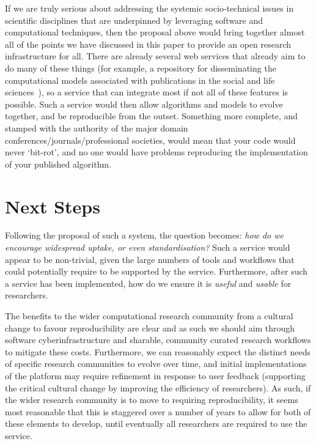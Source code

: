 \documentclass[a4paper,11pt]{article}
\begin{document}
If we are truly serious about addressing the systemic socio-technical
issues in scientific disciplines that are underpinned by leveraging
software and computational techniques, then the proposal above would
bring together almost all of the points we have discussed in this
paper to provide an open research infrastructure for all. There are
already several web services that already aim to do many of these
things (for example, a repository for disseminating the computational
models associated with publications in the social and life
sciences~\cite{rollins-et-al:2014}), so a service that can integrate
most if not all of these features is possible. Such a service would
then allow algorithms and models to evolve together, and be
reproducible from the outset. Something more complete, and stamped
with the authority of the major domain
conferences/journals/professional societies, would mean that your code
would never `bit-rot', and no one would have problems reproducing the
implementation of your published algorithm.


\section{Next Steps}

Following the proposal of such a system, the question becomes:
{\emph{how do we encourage widespread uptake, or even
standardisation?}}  Such a service would appear to be non-trivial,
given the large numbers of tools and workflows that could potentially
require to be supported by the service. Furthermore, after such a
service has been implemented, how do we ensure it is \emph{useful} and
\emph{usable} for researchers.

The benefits to the wider computational research community from a
cultural change to favour reproducibility are clear and as such we
should aim through software cyberinfrastructure and sharable,
community curated research workflows to mitigate these
costs. Furthermore, we can reasonably expect the distinct needs of
specific research communities to evolve over time, and initial
implementations of the platform may require refinement in response to
user feedback (supporting the critical cultural change by improving
the efficiency of researchers). As such, if the wider research
community is to move to requiring reproducibility, it seems most
reasonable that this is staggered over a number of years to allow for
both of these elements to develop, until eventually all researchers
are required to use the service.
\end{document}
